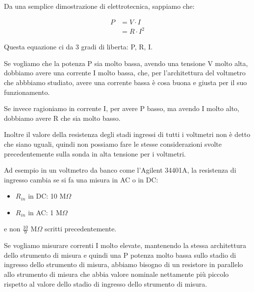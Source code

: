 Da una semplice dimostrazione di elettrotecnica, sappiamo che: 

{
    \Large 
    \begin{equation}
        \begin{split}
        P &= V \cdot I
        \\
        &= R \cdot I^{2}
        \end{split}
    \end{equation}
}

Questa equazione ci da 3 gradi di liberta: P, R, I. \newline 

Se vogliamo che la potenza P sia molto bassa, avendo una tensione V molto alta, dobbiamo avere una corrente I molto bassa, 
che, per l'architettura del voltmetro che abbbiamo studiato, avere una corrente bassa è cosa buona e giusta per il suo funzionamento. \newline 

Se invece ragioniamo in corrente I, 
per avere P basso, ma avendo I molto alto, dobbiamo avere R che sia molto basso. \newline 

Inoltre il valore della resistenza degli stadi ingressi di tutti i voltmetri non è detto che siano uguali, quindi non possiamo fare le stesse considerazioni svolte precedentemente sulla sonda in alta tensione per i voltmetri. \newline 

Ad esempio in un voltmetro da banco come l'Agilent 34401A, 
la resistenza di ingresso cambia se si fa una misura in AC o in DC: 

\begin{itemize}
    \item $R_{in}$ in DC: 10 M$\Omega$
    \item $R_{in}$ in AC: 1 M$\Omega$
\end{itemize}

e non $\frac{10}{9}$ M$\Omega$ scritti precedentemente. \newline 

Se vogliamo misurare correnti I molto elevate, 
mantenendo la stessa architettura dello strumento di misura e quindi una P potenza molto bassa sullo stadio di ingresso dello strumento di misura, 
abbiamo bisogno di un resistore in parallelo allo strumento di misura che abbia valore nominale nettamente più piccolo rispetto al valore dello stadio di ingresso dello strumento di misura. \newline

